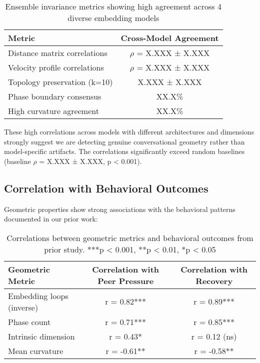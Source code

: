 \documentclass[11pt,letterpaper]{article}
\newcommand{\ensembleModels}{4}
\newcommand{\ensembleDistanceCorr}{X.XXX}
\newcommand{\ensembleDistanceCorrStd}{X.XXX}
\newcommand{\ensembleVelocityCorr}{X.XXX}
\newcommand{\ensembleVelocityCorrStd}{X.XXX}
\newcommand{\ensembleTopologyPres}{X.XXX}
\newcommand{\ensembleTopologyPresStd}{X.XXX}
\newcommand{\ensemblePhaseCons}{XX.X\%}
\newcommand{\ensembleCurvatureAgree}{XX.X\%}
\newcommand{\ensembleBaselineCorr}{X.XXX}
\newcommand{\ensembleBaselineStd}{X.XXX}
\begin{document}
\begin{table}[h]
\centering
\begin{tabular}{lc}
\toprule
Metric & Cross-Model Agreement \\
\midrule
Distance matrix correlations & $\rho$ = \ensembleDistanceCorr{} ± \ensembleDistanceCorrStd{} \\
Velocity profile correlations & $\rho$ = \ensembleVelocityCorr{} ± \ensembleVelocityCorrStd{} \\
Topology preservation (k=10) & \ensembleTopologyPres{} ± \ensembleTopologyPresStd{} \\
Phase boundary consensus & \ensemblePhaseCons{} \\
High curvature agreement & \ensembleCurvatureAgree{} \\
\bottomrule
\end{tabular}
\caption{Ensemble invariance metrics showing high agreement across \ensembleModels{} diverse embedding models}
\label{tab:ensemble}
\end{table}

These high correlations across models with different architectures and dimensions strongly suggest we are detecting genuine conversational geometry rather than model-specific artifacts. The correlations significantly exceed random baselines (baseline $\rho$ = \ensembleBaselineCorr{} ± \ensembleBaselineStd{}, p < 0.001).

\subsection{Correlation with Behavioral Outcomes}

Geometric properties show strong associations with the behavioral patterns documented in our prior work:

\begin{table}[h]
\centering
\begin{tabular}{lcc}
\toprule
Geometric Metric & Correlation with Peer Pressure & Correlation with Recovery \\
\midrule
Embedding loops (inverse) & r = 0.82*** & r = 0.89*** \\
Phase count & r = 0.71*** & r = 0.85*** \\
Intrinsic dimension & r = 0.43* & r = 0.12 (ns) \\
Mean curvature & r = -0.61** & r = -0.58** \\
\bottomrule
\end{tabular}
\caption{Correlations between geometric metrics and behavioral outcomes from prior study. ***p < 0.001, **p < 0.01, *p < 0.05}
\label{tab:correlations}
\end{table}
\end{document}
